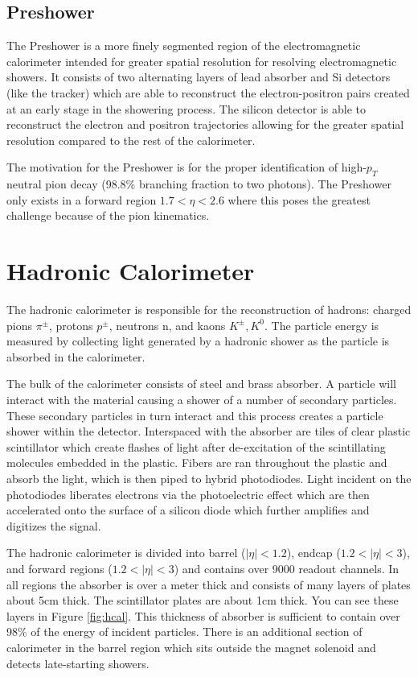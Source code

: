 \subsection{Preshower}

The Preshower is a more finely segmented region of the electromagnetic calorimeter intended for greater spatial resolution for resolving electromagnetic showers. It consists of two alternating layers of lead absorber and Si detectors (like the tracker) which are able to reconstruct the electron-positron pairs created at an early stage in the showering process. The silicon detector is able to reconstruct the electron and positron trajectories allowing for the greater spatial resolution compared to the rest of the calorimeter.

The motivation for the Preshower is for the proper identification of high-$p_{T}$ neutral pion decay (98.8\% branching fraction to two photons). The Preshower only exists in a forward region $1.7<\eta<2.6$ where this poses the greatest challenge because of the pion kinematics.

\section{Hadronic Calorimeter}

The hadronic calorimeter is responsible for the reconstruction of hadrons: charged pions $\pi^{\pm}$, protons $p^{\pm}$, neutrons n, and kaons $K^{\pm}, K^{0}$. The particle energy is measured by collecting light generated by a hadronic shower as the particle is absorbed in the calorimeter.\cite{hcaltdr}

The bulk of the calorimeter consists of steel and brass absorber. A particle will interact with the material causing a shower of a number of secondary particles. These secondary particles in turn interact and this process creates a particle shower within the detector. Interspaced with the absorber are tiles of clear plastic scintillator which create flashes of light after de-excitation of the scintillating molecules embedded in the plastic. Fibers are ran throughout the plastic and absorb the light, which is then piped to hybrid photodiodes. Light incident on the photodiodes liberates electrons via the photoelectric effect which are then accelerated onto the surface of a silicon diode which further amplifies and digitizes the signal.

The hadronic calorimeter is divided into barrel ($|\eta|<1.2$), endcap ($1.2<|\eta|<3$), and forward regions ($1.2<|\eta|<3$) and contains over 9000 readout channels. In all regions the absorber is over a meter thick and consists of many layers of plates about 5cm thick. The scintillator plates are about 1cm thick. You can see these layers in Figure \ref{fig:hcal}. This thickness of absorber is sufficient to contain over 98\% of the energy of incident particles. There is an additional section of calorimeter in the barrel region which sits outside the magnet solenoid and detects late-starting showers.

